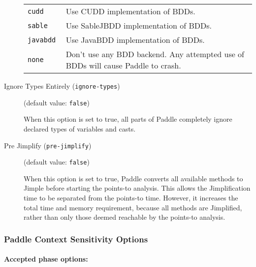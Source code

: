 \documentclass{article}
\begin{document}
\begin{description}
\begin{longtable}{p{1in}p{4in}}
{\tt cudd }
&

Use CUDD implementation of BDDs.
\\

{\tt sable }
&
Use SableJBDD implementation of BDDs.\\

{\tt javabdd }
&

Use JavaBDD implementation of BDDs.
\\

{\tt none }
&

Don't use any BDD backend. Any attempted use of BDDs will cause Paddle to crash.
\\

\end{longtable}


\item[Ignore Types Entirely ({\tt ignore-types})]
(default value: {\tt false})




When this option is set to true, all parts of Paddle completely ignore
declared types of variables and casts.
        


\item[Pre Jimplify ({\tt pre-jimplify})]
(default value: {\tt false})




When this option is set to true, Paddle converts all available methods to Jimple
before starting the points-to analysis. This allows the Jimplification
time to be separated from the points-to time. However, it increases the
total time and memory requirement, because all methods are Jimplified,
rather than only those deemed reachable by the points-to analysis.
        


\end{description}

\subsubsection{Paddle Context Sensitivity Options}


\paragraph{Accepted phase options:} 
\end{document}
